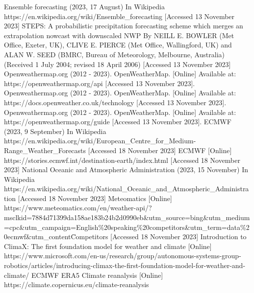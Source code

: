 \documentclass[../paper.tex]{subfiles}
\begin{document}
\begin{thebibliography}{00}
     Ensemble forecasting (2023, 17 August) In Wikipedia https://en.wikipedia.org/wiki/Ensemble\_forecasting [Accessed 13 November 2023]
     STEPS:
    A probabilistic precipitation forecasting scheme which merges an extrapolation nowcast with downscaled NWP
    By NEILL E. BOWLER (Met Office, Exeter, UK), CLIVE E. PIERCE (Met Office, Wallingford, UK) and ALAN W. SEED (BMRC,
    Bureau of Meteorology, Melbourne, Australia)
    (Received 1 July 2004; revised 18 April 2006) [Accessed 13 November 2023]
     Openweathermap.org (2012 - 2023).
    OpenWeatherMap.
    [Online] Available at: https://openweathermap.org/api [Accessed 13 November 2023].
     Openweathermap.org (2012 - 2023).
    OpenWeatherMap.
    [Online] Available at: https://docs.openweather.co.uk/technology [Accessed 13 November 2023].
     Openweathermap.org (2012 - 2023).
    OpenWeatherMap.
    [Online] Available at: https://openweathermap.org/guide [Accessed 13 November 2023].
     ECMWF (2023, 9 September) In Wikipedia https://en.wikipedia.org/wiki/European\_Centre\_for\_Medium-Range\_Weather\_Forecasts [Accessed 18 November 2023]
     ECMWF [Online] https://stories.ecmwf.int/destination-earth/index.html [Accessed 18 November 2023]
     National Oceanic and Atmospheric Administration (2023, 15 November) In Wikipedia https://en.wikipedia.org/wiki/National\_Oceanic\_and\_Atmospheric\_Administration [Accessed 18 November 2023]
     Meteomatics [Online] https://www.meteomatics.com/en/weather-api/?msclkid=7884d71399da158ae183b24b2d0990eb\&utm\_source=bing\&utm\_medium=cpc\&utm\_campaign=English\%20speaking\%20competitors\&utm\_term=data\%20ecmwf\&utm\_content\=Competitors [Accessed 18 November 2023]
     Introduction to ClimaX: The first foundation model for weather and climate [Online] https://www.microsoft.com/en-us/research/group/autonomous-systems-group-robotics/articles/introducing-climax-the-first-foundation-model-for-weather-and-climate/
     ECMWF ERA5 Climate reanalysis [Online] https://climate.copernicus.eu/climate-reanalysis

\end{thebibliography}
\end{document}
